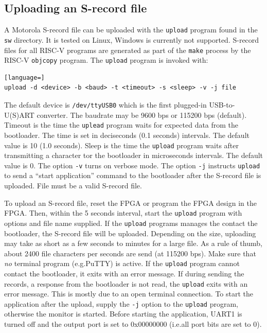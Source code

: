 \documentclass[12pt]{article}
\begin{document}
\subsection{Uploading an S-record file}
A Motorola S-record file can be uploaded with the \lstinline|upload| program found in the \lstinline|sw| directory. It is tested on Linux, Windows is currently not supported. S-record files for all RISC-V programs are generated as part of the \lstinline|make| process by the RISC-V \lstinline|objcopy| program. The \lstinline|upload| program is invoked with:

\begin{lstlisting}[language=]
upload -d <device> -b <baud> -t <timeout> -s <sleep> -v -j file
\end{lstlisting}

The default device is \lstinline|/dev/ttyUSB0| which is the first plugged-in USB-to-U(S)ART converter. The baudrate may be 9600 bps or 115200 bps (default). Timeout is the time the \lstinline|uplead| program waits for expected data from the bootloader. The time is set in deciseconds (0.1 seconds) intervals. The default value is 10 (1.0 seconds). Sleep is the time the \lstinline|upload| program waits after transmitting a character tor the bootloader in microseconds intervals. The default value is 0. The option \lstinline|-v| turns on verbose mode. The option \lstinline[]|-j| instructs \lstinline|upload| to send a ``start application'' command to the bootloader after the S-record file is uploaded. File must be a valid S-record file.

To upload an S-record file, reset the FPGA or program the FPGA design in the FPGA. Then, within the 5 seconds interval, start the \lstinline|upload| program with options and file name supplied. If the \lstinline|upload| programs manages the contact the bootloader, the S-record file will be uploaded. Depending on the size, uploading may take as short as a few seconds to minutes for a large file. As a rule of thumb, about 2400 file characters per seconds are send (at 115200 bps). Make sure that \emph{no} terminal program (e.g.\@ PuTTY) is active. If the \lstinline|upload| program cannot contact the bootloader, it exits with an error message. If during sending the records, a response from the bootloader is not read, the \lstinline|upload| exits with an error message. This is mostly due to an open terminal connection. To start the application after the upload, supply the \lstinline|-j| option to the \lstinline|upload| program, otherwise the monitor is started. Before starting the application, UART1 is turned off and the output port is set to 0x00000000 (i.e.\@ all port bits are set to 0).
\end{document}
